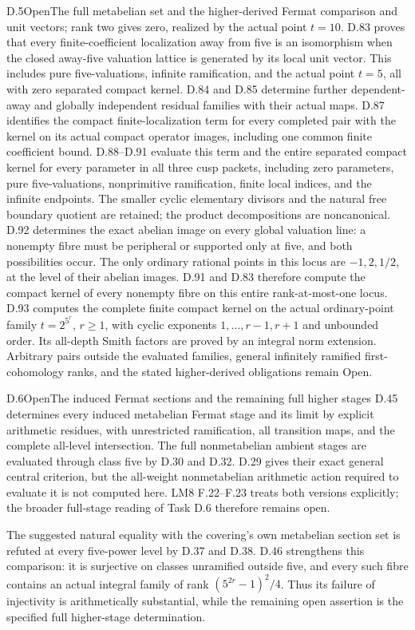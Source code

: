 \begin{statement}{D.5}{Open}{The full metabelian set and the higher-derived Fermat comparison}
and unit vectors; rank two gives zero, realized by the actual
point \(t=10\). D.83 proves that every finite-coefficient
localization away from five is an isomorphism when the closed
away-five valuation lattice is generated by its local unit
vector. This includes pure five-valuations, infinite ramification,
and the actual point \(t=5\), all with zero separated compact
kernel. D.84 and D.85 determine further dependent-away and
globally independent residual families with their actual maps.
D.87 identifies the compact finite-localization term for every
completed pair with the kernel on its actual compact operator
images, including one common finite coefficient bound.
D.88--D.91 evaluate this term and the entire separated compact
kernel for every parameter in all three cusp packets, including
zero parameters, pure five-valuations, nonprimitive ramification,
finite local indices, and the infinite endpoints. The smaller
cyclic elementary divisors and the natural free boundary quotient
are retained; the product decompositions are noncanonical.
D.92 determines the exact abelian image on every global
valuation line: a nonempty fibre must be peripheral or
supported only at five, and both possibilities occur.
The only ordinary rational points in this locus are
\(-1,2,1/2\), at the level of their abelian images.
D.91 and D.83 therefore compute the compact kernel of every
nonempty fibre on this entire rank-at-most-one locus.
D.93 computes the complete finite compact kernel on the actual
ordinary-point family \(t=2^{5^r}\), \(r\ge1\), with cyclic
exponents \(1,\ldots,r-1,r+1\) and unbounded order. Its
all-depth Smith factors are proved by an integral norm extension.
Arbitrary pairs outside the evaluated families, general infinitely
ramified first-cohomology ranks, and the stated higher-derived
obligations remain Open.
\end{statement}

\begin{statement}{D.6}{Open}{The induced Fermat sections and the remaining full higher stages}
D.45 determines every induced metabelian
Fermat stage and its limit by explicit
arithmetic residues, with unrestricted
ramification, all transition maps, and
the complete all-level intersection.
The full nonmetabelian ambient stages are
evaluated through class five by D.30 and
D.32. D.29 gives their exact general
central criterion, but the all-weight
nonmetabelian arithmetic action required
to evaluate it is not computed here.
LM8 F.22--F.23 treats both versions
explicitly; the broader full-stage
reading of Task D.6 therefore remains open.

The suggested natural equality with
the covering's own metabelian section
set is refuted at every five-power
level by D.37 and D.38.
D.46 strengthens this comparison:
it is surjective on classes unramified
outside five, and every such fibre
contains an actual integral family
of rank \((5^{2r}-1)^2/4\).
Thus its failure of injectivity is
arithmetically substantial, while
the remaining open assertion is
the specified full higher-stage
determination.
\end{statement}

